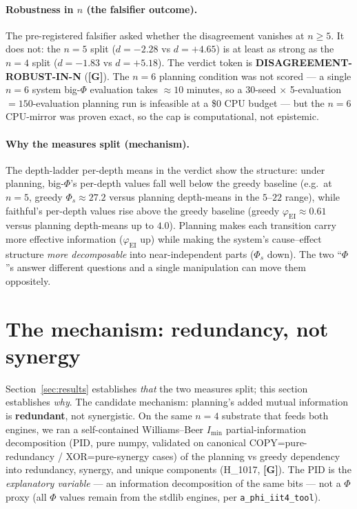 \documentclass[11pt,a4paper]{article}
\providecommand{\tierGreen}{\textcolor{green!50!black}{\textbf{[G]}}}
\newcommand{\faithful}{\ensuremath{\varphi_{\mathrm{EI}}}}
\newcommand{\bigphi}{\ensuremath{\Phi_{s}}}
\begin{document}
\paragraph{Robustness in $n$ (the falsifier outcome).} The pre-registered
falsifier asked whether the disagreement vanishes at $n\ge 5$. It does not: the
$n=5$ split ($d=-2.28$ vs $d=+4.65$) is at least as strong as the $n=4$ split
($d=-1.83$ vs $d=+5.18$). The verdict token is \textbf{DISAGREEMENT-ROBUST-IN-N}
(\tierGreen). The $n=6$ planning condition was not scored --- a single $n=6$
system big-$\Phi$ evaluation takes $\approx 10$ minutes, so a 30-seed
$\times$ 5-evaluation $=150$-evaluation planning run is infeasible at a \$0 CPU
budget --- but the $n=6$ CPU-mirror was proven exact, so the cap is
computational, not epistemic.

\paragraph{Why the measures split (mechanism).} The depth-ladder
per-depth means in the verdict show the structure: under planning, big-$\Phi$'s
per-depth values fall well below the greedy baseline (e.g.\ at $n=5$,
greedy $\bigphi\approx 27.2$ versus planning depth-means in the
$5$--$22$ range), while faithful's per-depth values rise above the greedy
baseline (greedy $\faithful\approx 0.61$ versus planning depth-means up to
$4.0$). Planning makes each transition carry more effective information
(\faithful{} up) while making the system's cause--effect structure
\emph{more decomposable} into near-independent parts (\bigphi{} down). The two
``$\Phi$''s answer different questions and a single manipulation can move them
oppositely.

\section{The mechanism: redundancy, not synergy}
\label{sec:mechanism}

Section~\ref{sec:results} establishes \emph{that} the two measures split; this
section establishes \emph{why}. The candidate mechanism: planning's added mutual
information is \textbf{redundant}, not synergistic. On the same $n=4$ substrate
that feeds both engines, we ran a self-contained Williams--Beer $I_{\min}$
partial-information decomposition \citep{williams2010pid} (PID, pure numpy,
validated on canonical COPY=pure-redundancy / XOR=pure-synergy cases) of the
planning vs greedy
dependency into redundancy, synergy, and unique components (H\_1017,
\tierGreen). The PID is the \emph{explanatory variable} --- an information
decomposition of the same bits --- not a $\Phi$ proxy (all $\Phi$ values remain
from the stdlib engines, per \texttt{a\_phi\_iit4\_tool}).
\end{document}
